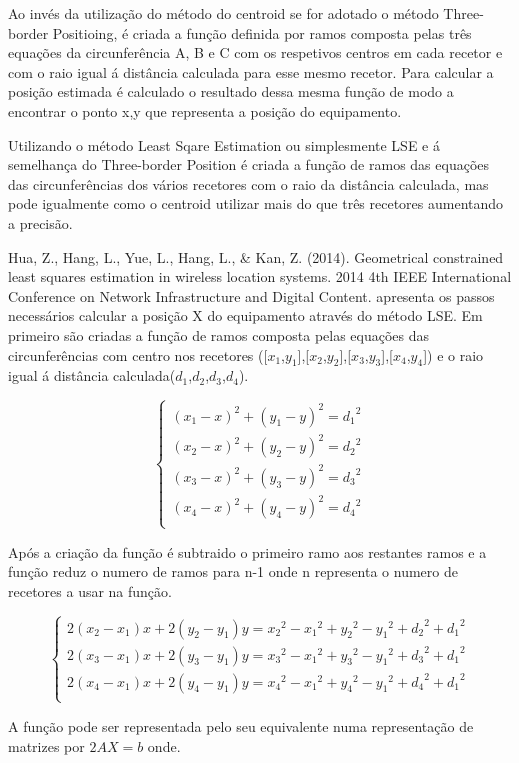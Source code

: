 Ao invés da utilização do método do centroid se for adotado o método Three-border Positioing, é criada a função definida por ramos composta pelas três equações da circunferência A, B e C com os respetivos centros em cada recetor e com o raio igual á distância calculada para esse mesmo recetor. Para calcular a posição estimada é calculado o resultado dessa mesma função de modo a encontrar o ponto x,y que representa a posição do equipamento.
\par 
Utilizando o método Least Sqare Estimation ou simplesmente LSE e á semelhança do Three-border Position\cite{Zhu2014} é criada a função de ramos das equações das circunferências dos vários recetores com o raio da distância calculada, mas pode igualmente como o centroid utilizar mais do que três recetores aumentando a precisão. \par Hua, Z., Hang, L., Yue, L., Hang, L., \& Kan, Z. (2014). Geometrical constrained least squares estimation in wireless location systems. 2014 4th IEEE International Conference on Network Infrastructure and Digital Content. apresenta os passos necessários calcular a posição X do equipamento através do método LSE. Em primeiro são criadas a função de ramos composta pelas equações das circunferências com centro nos recetores ([$x_{1}$,$y_{1}$],[$x_{2}$,$y_{2}$],[$x_{3}$,$y_{3}$],[$x_{4}$,$y_{4}$]) e o raio igual á distância calculada($d_{1}$,$d_{2}$,$d_{3}$,$d_{4}$).
\begin{center}
\[
  \begin{cases}
      (x_{1} -x)^2 + (y_{1}-y)^2 = {d_{1}}^2\\
      (x_{2} -x)^2 + (y_{2}-y)^2 = {d_{2}}^2\\
      (x_{3} -x)^2 + (y_{3}-y)^2 = {d_{3}}^2\\
      (x_{4} -x)^2 + (y_{4}-y)^2 = {d_{4}}^2\\
  \end{cases}
\]
\end{center}

\par Após a criação da função é subtraido o primeiro ramo aos restantes ramos e a função reduz o numero de ramos para n-1 onde n representa o numero de recetores a usar na função.
\begin{center}

\[
  \begin{cases}
     2(x_{2}-x_{1})x+2(y_{2}-y_{1})y={x_{2}}^2-{x_{1}}^2+{y_{2}}^2-{y_{1}}^2+{d_{2}}^2+{ d_{1}}^2\\
     2(x_{3}-x_{1})x+2(y_{3}-y_{1})y={x_{3}}^2-{x_{1}}^2+{y_{3}}^2-{y_{1}}^2+{d_{3}}^2+{ d_{1}}^2\\
     2(x_{4}-x_{1})x+2(y_{4}-y_{1})y={x_{4}}^2-{x_{1}}^2+{y_{4}}^2-{y_{1}}^2+{d_{4}}^2+{ d_{1}}^2\\
  \end{cases}
\]
\end{center}
\par A função pode ser representada pelo seu equivalente numa representação de matrizes por $2AX = b$ onde.

